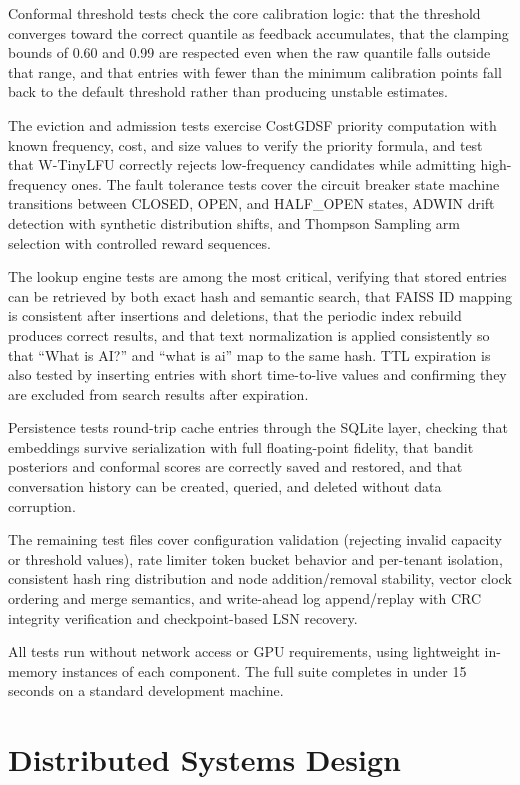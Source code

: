 \documentclass[12pt,a4paper]{report}
\begin{document}
Conformal threshold tests check the core calibration logic: that the threshold converges toward the correct quantile as feedback accumulates, that the clamping bounds of 0.60 and 0.99 are respected even when the raw quantile falls outside that range, and that entries with fewer than the minimum calibration points fall back to the default threshold rather than producing unstable estimates.

The eviction and admission tests exercise CostGDSF priority computation with known frequency, cost, and size values to verify the priority formula, and test that W-TinyLFU correctly rejects low-frequency candidates while admitting high-frequency ones. The fault tolerance tests cover the circuit breaker state machine transitions between CLOSED, OPEN, and HALF\_OPEN states, ADWIN drift detection with synthetic distribution shifts, and Thompson Sampling arm selection with controlled reward sequences.

The lookup engine tests are among the most critical, verifying that stored entries can be retrieved by both exact hash and semantic search, that FAISS ID mapping is consistent after insertions and deletions, that the periodic index rebuild produces correct results, and that text normalization is applied consistently so that ``What is AI?'' and ``what is ai'' map to the same hash. TTL expiration is also tested by inserting entries with short time-to-live values and confirming they are excluded from search results after expiration.

Persistence tests round-trip cache entries through the SQLite layer, checking that embeddings survive serialization with full floating-point fidelity, that bandit posteriors and conformal scores are correctly saved and restored, and that conversation history can be created, queried, and deleted without data corruption.

The remaining test files cover configuration validation (rejecting invalid capacity or threshold values), rate limiter token bucket behavior and per-tenant isolation, consistent hash ring distribution and node addition/removal stability, vector clock ordering and merge semantics, and write-ahead log append/replay with CRC integrity verification and checkpoint-based LSN recovery.

All tests run without network access or GPU requirements, using lightweight in-memory instances of each component. The full suite completes in under 15 seconds on a standard development machine.

\section{Distributed Systems Design}
\end{document}
